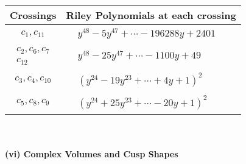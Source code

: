 \documentclass[1p]{elsarticle_modified}
\theoremstyle{definition}
\begin{document}
\begin{tabular}{m{50pt}|m{274pt}}
Crossings & \hspace{64pt}Riley Polynomials at each crossing \\
\hline $$\begin{aligned}c_{1},c_{11}\end{aligned}$$&$\begin{aligned}
&y^{48}-5 y^{47}+\cdots-196288 y+2401
\end{aligned}$\\
\hline $$\begin{aligned}c_{2},c_{6},c_{7}\\c_{12}\end{aligned}$$&$\begin{aligned}
&y^{48}-25 y^{47}+\cdots-1100 y+49
\end{aligned}$\\
\hline $$\begin{aligned}c_{3},c_{4},c_{10}\end{aligned}$$&$\begin{aligned}
&(y^{24}-19 y^{23}+\cdots+4 y+1)^{2}
\end{aligned}$\\
\hline $$\begin{aligned}c_{5},c_{8},c_{9}\end{aligned}$$&$\begin{aligned}
&(y^{24}+25 y^{23}+\cdots-20 y+1)^{2}
\end{aligned}$\\
\hline
\end{tabular}\\~\\
\newpage\flushleft \textbf{(vi) Complex Volumes and Cusp Shapes}
\end{document}
